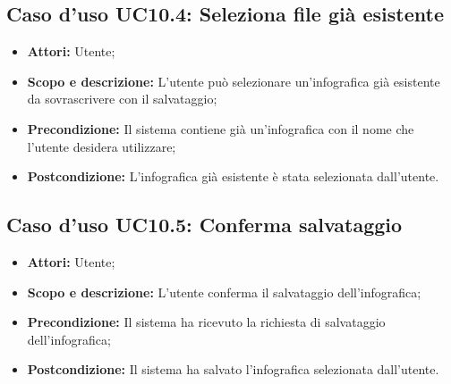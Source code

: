 \subsection{Caso d'uso UC10.4: Seleziona file già esistente}
\begin{itemize}
	\item \textbf{Attori:} Utente;
	\item \textbf{Scopo e descrizione:} L'utente può selezionare un'\gls{infografica} già esistente da sovrascrivere con il salvataggio;
	\item \textbf{Precondizione:} Il sistema contiene già un'\gls{infografica} con il nome che l'utente desidera utilizzare;
	\item \textbf{Postcondizione:} L'\gls{infografica} già esistente è stata selezionata dall'utente.
\end{itemize}

\subsection{Caso d'uso UC10.5: Conferma salvataggio}
\begin{itemize}
	\item \textbf{Attori:} Utente;
	\item \textbf{Scopo e descrizione:} L'utente conferma il salvataggio dell'\gls{infografica};
	\item \textbf{Precondizione:} Il sistema ha ricevuto la richiesta di salvataggio dell'\gls{infografica};
	\item \textbf{Postcondizione:} Il sistema ha salvato l'\gls{infografica} selezionata dall'utente.
\end{itemize}